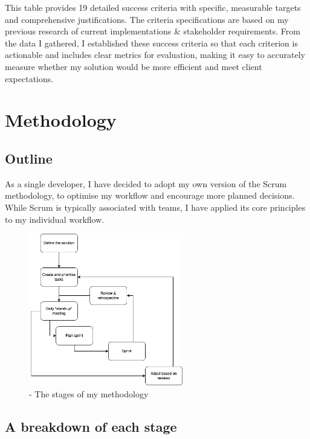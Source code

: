 \textbf{}
\newline
This table provides 19 detailed success criteria with specific, measurable targets and comprehensive justifications. The criteria specifications are based on my previous research of current implementations \& stakeholder requirements. From the data I gathered, I established these success criteria so that each criterion is actionable and includes clear metrics for evaluation, making it easy to accurately measure whether my solution would be more efficient and meet client expectations.

\section{Methodology}

\subsection{Outline}

As a single developer, I have decided to adopt my own version of the Scrum methodology, to optimise my workflow and encourage more planned decisions. While Scrum is typically associated with teams, I have applied its core principles to my individual workflow. \newline

\begin{figure}[h!] 
	\centering    
	\includegraphics[width=0.6\textwidth]{Methodology diagram (1).png}
	\caption{- The stages of my methodology}
\end{figure}

\newpage

\subsection{A breakdown of each stage}

